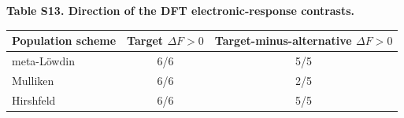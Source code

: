 {\fontsize{10}{13}\selectfont\textbf{Table S13. Direction of the DFT electronic-response contrasts.}}\\[5pt]
\begin{tabular}{lcc}
\toprule
Population scheme & Target $\Delta F>0$ & Target-minus-alternative $\Delta F>0$ \\
\midrule
meta-L\"owdin & 6/6 & 5/5 \\
Mulliken & 6/6 & 2/5 \\
Hirshfeld & 6/6 & 5/5 \\
\bottomrule
\end{tabular}